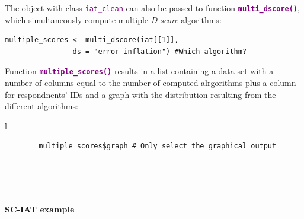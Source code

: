 \documentclass[a0,landscape]{a0poster}
\begin{document}
\begin{multicols*}{3}
The object with class \textcolor{purple}{\texttt{iat\_clean}} can also be passed to function \textbf{\textcolor{purple}{\texttt{multi\_dscore()}}}, which simultaneously compute multiple \emph{D-score} algorithms: 
\vspace{3mm}
\begin{lstlisting}
multiple_scores <- multi_dscore(iat[[1]], 
	            ds = "error-inflation") #Which algorithm?
\end{lstlisting}
\vspace{3mm}

Function \textbf{\textcolor{purple}{\texttt{multiple\_scores()}}} results in a list containing a data set with a number of columns equal to the number of computed alrgorithms plus a column for respondnents' IDs and a graph with the distribution resulting from the different algorithms: 
\vspace{3mm}
	\begin{tabular}{l}
		\begin{lstlisting}
		multiple_scores$graph # Only select the graphical output
		\end{lstlisting}\\
		\\
		  \\
	\end{tabular}


 
\vfill\null
\columnbreak

\begin{center}
	\huge \textbf{\textcolor{title}{SC-IAT example}}
\end{center}


\end{multicols*}
\end{document}

